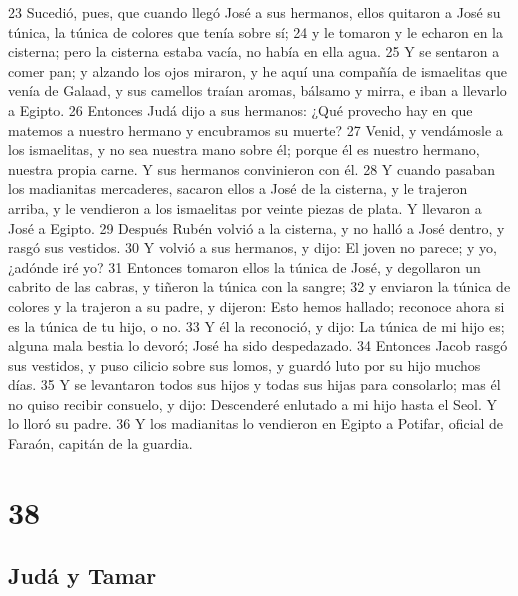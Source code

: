 23 Sucedió, pues, que cuando llegó José a sus hermanos, ellos quitaron a José su túnica, la túnica de colores que tenía sobre sí;
24 y le tomaron y le echaron en la cisterna; pero la cisterna estaba vacía, no había en ella agua.
25 Y se sentaron a comer pan; y alzando los ojos miraron, y he aquí una compañía de ismaelitas que venía de Galaad, y sus camellos traían aromas, bálsamo y mirra, e iban a llevarlo a Egipto.
26 Entonces Judá dijo a sus hermanos: ¿Qué provecho hay en que matemos a nuestro hermano y encubramos su muerte?
27 Venid, y vendámosle a los ismaelitas, y no sea nuestra mano sobre él; porque él es nuestro hermano, nuestra propia carne. Y sus hermanos convinieron con él.
28 Y cuando pasaban los madianitas mercaderes, sacaron ellos a José de la cisterna, y le trajeron arriba, y le vendieron a los ismaelitas por veinte piezas de plata. Y llevaron a José a Egipto.
29 Después Rubén volvió a la cisterna, y no halló a José dentro, y rasgó sus vestidos.
30 Y volvió a sus hermanos, y dijo: El joven no parece; y yo, ¿adónde iré yo?
31 Entonces tomaron ellos la túnica de José, y degollaron un cabrito de las cabras, y tiñeron la túnica con la sangre;
32 y enviaron la túnica de colores y la trajeron a su padre, y dijeron: Esto hemos hallado; reconoce ahora si es la túnica de tu hijo, o no.
33 Y él la reconoció, y dijo: La túnica de mi hijo es; alguna mala bestia lo devoró; José ha sido despedazado.
34 Entonces Jacob rasgó sus vestidos, y puso cilicio sobre sus lomos, y guardó luto por su hijo muchos días.
35 Y se levantaron todos sus hijos y todas sus hijas para consolarlo; mas él no quiso recibir consuelo, y dijo: Descenderé enlutado a mi hijo hasta el Seol. Y lo lloró su padre.
36 Y los madianitas lo vendieron en Egipto a Potifar, oficial de Faraón, capitán de la guardia.

\chapter{38}

\section{Judá y Tamar}


